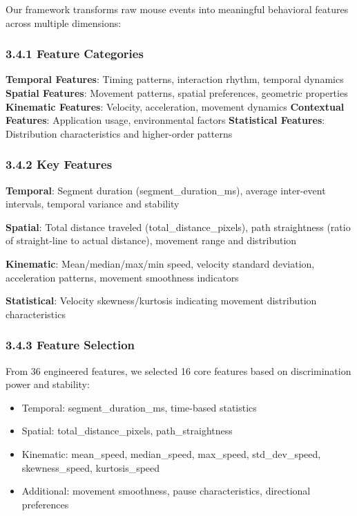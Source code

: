 \documentclass[
  11pt,
  a4paper,
]{article}
\providecommand{\tightlist}{%
  \setlength{\itemsep}{0pt}\setlength{\parskip}{0pt}}
\begin{document}
Our framework transforms raw mouse events into meaningful behavioral
features across multiple dimensions:

\subsubsection{3.4.1 Feature Categories}\label{feature-categories-1}

\textbf{Temporal Features}: Timing patterns, interaction rhythm,
temporal dynamics \textbf{Spatial Features}: Movement patterns, spatial
preferences, geometric properties\\
\textbf{Kinematic Features}: Velocity, acceleration, movement dynamics
\textbf{Contextual Features}: Application usage, environmental factors
\textbf{Statistical Features}: Distribution characteristics and
higher-order patterns

\subsubsection{3.4.2 Key Features}\label{key-features}

\textbf{Temporal}: Segment duration (segment\_duration\_ms), average
inter-event intervals, temporal variance and stability

\textbf{Spatial}: Total distance traveled (total\_distance\_pixels),
path straightness (ratio of straight-line to actual distance), movement
range and distribution

\textbf{Kinematic}: Mean/median/max/min speed, velocity standard
deviation, acceleration patterns, movement smoothness indicators

\textbf{Statistical}: Velocity skewness/kurtosis indicating movement
distribution characteristics

\subsubsection{3.4.3 Feature Selection}\label{feature-selection}

From 36 engineered features, we selected 16 core features based on
discrimination power and stability:

\begin{itemize}
\tightlist
\item
  Temporal: segment\_duration\_ms, time-based statistics
\item
  Spatial: total\_distance\_pixels, path\_straightness
\item
  Kinematic: mean\_speed, median\_speed, max\_speed, std\_dev\_speed,
  skewness\_speed, kurtosis\_speed
\item
  Additional: movement smoothness, pause characteristics, directional
  preferences
\end{itemize}
\end{document}
